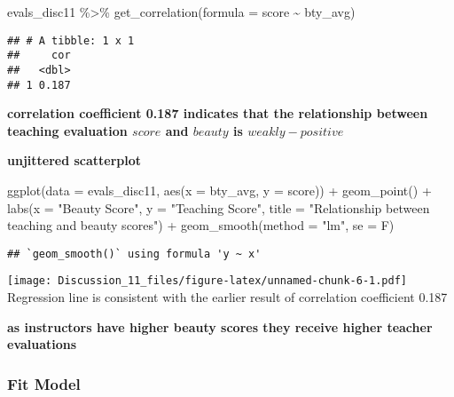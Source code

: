 \documentclass[
]{article}
\newenvironment{Shaded}{\begin{snugshade}}{\end{snugshade}}
\newcommand{\AttributeTok}[1]{\textcolor[rgb]{0.77,0.63,0.00}{#1}}
\newcommand{\FunctionTok}[1]{\textcolor[rgb]{0.00,0.00,0.00}{#1}}
\newcommand{\NormalTok}[1]{#1}
\newcommand{\SpecialCharTok}[1]{\textcolor[rgb]{0.00,0.00,0.00}{#1}}
\newcommand{\StringTok}[1]{\textcolor[rgb]{0.31,0.60,0.02}{#1}}
\begin{document}
\begin{Shaded}
\begin{Highlighting}[]
\NormalTok{evals\_disc11 }\SpecialCharTok{\%\textgreater{}\%} 
  \FunctionTok{get\_correlation}\NormalTok{(}\AttributeTok{formula =}\NormalTok{ score }\SpecialCharTok{\textasciitilde{}}\NormalTok{ bty\_avg)}
\end{Highlighting}
\end{Shaded}

\begin{verbatim}
## # A tibble: 1 x 1
##     cor
##   <dbl>
## 1 0.187
\end{verbatim}

\textbf{correlation coefficient 0.187 indicates that the relationship
between teaching evaluation \(score\) and \(beauty\) is
\(weakly-positive\)}

\textbf{unjittered scatterplot}

\begin{Shaded}
\begin{Highlighting}[]
\FunctionTok{ggplot}\NormalTok{(}\AttributeTok{data =}\NormalTok{ evals\_disc11, }\FunctionTok{aes}\NormalTok{(}\AttributeTok{x =}\NormalTok{ bty\_avg, }\AttributeTok{y =}\NormalTok{ score)) }\SpecialCharTok{+} 
  \FunctionTok{geom\_point}\NormalTok{() }\SpecialCharTok{+}
  \FunctionTok{labs}\NormalTok{(}\AttributeTok{x =} \StringTok{"Beauty Score"}\NormalTok{, }\AttributeTok{y =} \StringTok{"Teaching Score"}\NormalTok{,}
       \AttributeTok{title =} \StringTok{"Relationship between teaching and beauty scores"}\NormalTok{) }\SpecialCharTok{+} 
    \FunctionTok{geom\_smooth}\NormalTok{(}\AttributeTok{method =} \StringTok{"lm"}\NormalTok{, }\AttributeTok{se =}\NormalTok{ F)}
\end{Highlighting}
\end{Shaded}

\begin{verbatim}
## `geom_smooth()` using formula 'y ~ x'
\end{verbatim}

\texttt{[image: Discussion\_11\_files/figure-latex/unnamed-chunk-6-1.pdf]}
Regression line is consistent with the earlier result of correlation
coefficient 0.187

\textbf{as instructors have higher beauty scores they receive higher
teacher evaluations}

\hypertarget{fit-model}{%
\subsubsection{Fit Model}\label{fit-model}}
\end{document}
